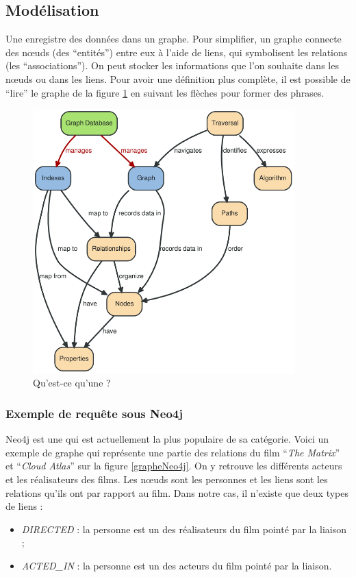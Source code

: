 \subsection{Modélisation}
	Une \bddGraphe{} enregistre des données dans un graphe. Pour simplifier, un graphe connecte des nœuds (des \enquote{entités}) entre eux à l'aide de liens, qui symbolisent les relations (les \enquote{associations}). On peut stocker les informations que l'on souhaite dans les nœuds ou dans les liens. Pour avoir une définition plus complète, il est possible de \enquote{lire} le graphe de la figure \ref{bddGrapheSVG} en suivant les flèches pour former des phrases.

	\begin{figure}[H]
		\centering
		\includegraphics[width=0.9\textwidth]{images/bddGraphe.png}
		\caption{Qu'est-ce qu'une \bddGraphe{} ? \cite{bddGrapheSchema}}
		\label{bddGrapheSVG}
	\end{figure}

	\subsubsection{Exemple de requête sous Neo4j}
		Neo4j est une \bddGraphe{} qui est actuellement la plus populaire de sa catégorie. Voici un exemple de graphe qui représente une partie des relations du film \enquote{\textit{The Matrix}} et \enquote{\textit{Cloud Atlas}} sur la figure \ref{grapheNeo4j}. On y retrouve les différents acteurs et les réalisateurs des films. Les nœuds sont les personnes et les liens sont les relations qu'ils ont par rapport au film. Dans notre cas, il n'existe que deux types de liens :
		\vspace{5px}
		\begin{itemize}
			\item \textit{DIRECTED} : la personne est un des réalisateurs du film pointé par la liaison ; 
			\item \textit{ACTED\_IN} : la personne est un des acteurs du film pointé par la liaison. 
		\end{itemize}


